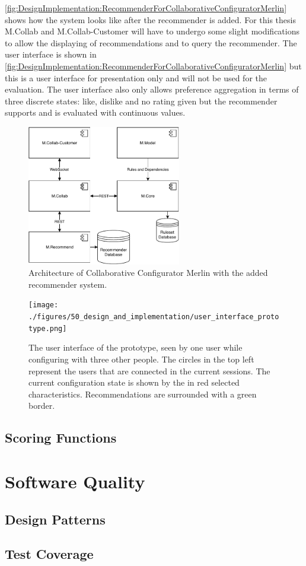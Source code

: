 \autoref{fig:DesignImplementation:RecommenderForCollaborativeConfiguratorMerlin} shows how the system looks like after the recommender is added. For this thesis M.Collab and M.Collab-Customer will have to undergo some slight modifications to allow the displaying of recommendations and to query the recommender. The user interface is shown in \autoref{fig:DesignImplementation:RecommenderForCollaborativeConfiguratorMerlin} but this is a user interface for presentation only and will not be used for the evaluation. The user interface also only allows preference aggregation in terms of three discrete states: like, dislike and no rating given but the recommender supports and is evaluated with continuous values.

\begin{figure}
    \centering
    \includegraphics[width=0.6\textwidth]{./figures/50_design_and_implementation/MerlinCollabRecommender.pdf}
    \caption{Architecture of Collaborative Configurator Merlin with the added recommender system.}
    \label{fig:DesignImplementation:RecommenderForCollaborativeConfiguratorMerlin}
\end{figure}

\begin{figure}
    \centering
    \texttt{[image: ./figures/50\_design\_and\_implementation/user\_interface\_prototype.png]}
    \caption{The user interface of the prototype, seen by one user while configuring with three other people. The circles in the top left represent the users that are connected in the current sessions. The current configuration state is shown by the in red selected characteristics. Recommendations are surrounded with a green border.}
    \label{fig:DesignImplementation:UserInterface}
\end{figure}

\subsection{Scoring Functions}

\section{Software Quality}
\label{sec:DesignImplementation:SoftwareQuality}

\subsection{Design Patterns}

\subsection{Test Coverage}